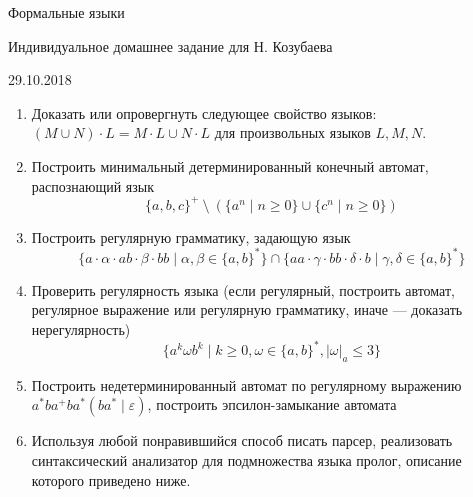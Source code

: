 \documentclass[12pt]{article}
\begin{document}
\begin{center}
{\LARGE Формальные языки}

{\Large Индивидуальное домашнее задание для Н. Козубаева}

{\large 29.10.2018}
\end{center}

\bigskip

\begin{enumerate}
  \item Доказать или опровергнуть следующее свойство языков: $( M \cup N ) \cdot L = M \cdot L \cup N \cdot L $ для произвольных языков $L, M, N$.

  \item Построить минимальный детерминированный конечный автомат, распознающий язык  \[ \{ a,b,c \}^+ \ \setminus \ ( \{a^n \mid n \geq 0\} \cup \{c^n \mid n \geq 0\})\]


  \item Построить регулярную грамматику, задающую язык \[\{ a \cdot \alpha \cdot a b \cdot \beta \cdot b b \mid \alpha, \beta \in \{ a, b \}^* \} \cap \{a a \cdot \gamma \cdot b b \cdot \delta \cdot b \mid \gamma, \delta \in \{a, b\}^* \} \]
  \item Проверить регулярность языка (если регулярный, построить автомат, регулярное выражение или регулярную грамматику, иначе --- доказать нерегулярность)
  \[ \{ a^k \omega b^k \mid k \geq 0, \omega \in \{a,b\}^*,|\omega|_a \leq 3 \} \]
  \item {Построить недетерминированный автомат по регулярному выражению $ a^* b a^+ b a^* (b a^* \mid \varepsilon) $, построить эпсилон-замыкание автомата }
  \item {Используя любой понравившийся способ писать парсер, реализовать синтаксический анализатор для подмножества языка пролог, описание которого приведено ниже.}

\end{enumerate}
\end{document}
